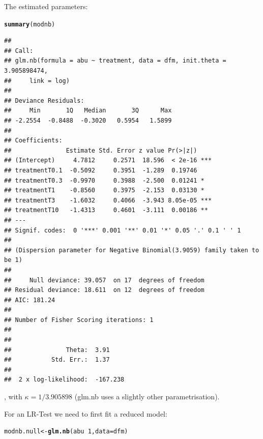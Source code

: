 \documentclass{scrartcl}\usepackage[]{graphicx}\usepackage[]{color}
\makeatletter
\newcommand{\hlnum}[1]{\textcolor[rgb]{0.686,0.059,0.569}{#1}}%
\newcommand{\hlopt}[1]{\textcolor[rgb]{0,0,0}{#1}}%
\newcommand{\hlstd}[1]{\textcolor[rgb]{0.345,0.345,0.345}{#1}}%
\newcommand{\hlkwb}[1]{\textcolor[rgb]{0.69,0.353,0.396}{#1}}%
\newcommand{\hlkwc}[1]{\textcolor[rgb]{0.333,0.667,0.333}{#1}}%
\newcommand{\hlkwd}[1]{\textcolor[rgb]{0.737,0.353,0.396}{\textbf{#1}}}%
\newenvironment{kframe}{%
 \def\at@end@of@kframe{}%
 \ifinner\ifhmode%
  \def\at@end@of@kframe{\end{minipage}}%
  \begin{minipage}{\columnwidth}%
 \fi\fi%
 \def\FrameCommand##1{\hskip\@totalleftmargin \hskip-\fboxsep
 \colorbox{shadecolor}{##1}\hskip-\fboxsep
     \hskip-\linewidth \hskip-\@totalleftmargin \hskip\columnwidth}%
 \MakeFramed {\advance\hsize-\width
   \@totalleftmargin\z@ \linewidth\hsize
   \@setminipage}}%
 {\par\unskip\endMakeFramed%
 \at@end@of@kframe}
\newenvironment{knitrout}{}{} %
\makeatother
\begin{document}
The estimated parameters:
\begin{knitrout}
\color{fgcolor}\begin{kframe}
\begin{alltt}
\hlkwd{summary}\hlstd{(modnb)}
\end{alltt}
\begin{verbatim}
## 
## Call:
## glm.nb(formula = abu ~ treatment, data = dfm, init.theta = 3.905898474, 
##     link = log)
## 
## Deviance Residuals: 
##     Min       1Q   Median       3Q      Max  
## -2.2554  -0.8488  -0.3020   0.5954   1.5899  
## 
## Coefficients:
##               Estimate Std. Error z value Pr(>|z|)    
## (Intercept)     4.7812     0.2571  18.596  < 2e-16 ***
## treatmentT0.1  -0.5092     0.3951  -1.289  0.19746    
## treatmentT0.3  -0.9970     0.3988  -2.500  0.01241 *  
## treatmentT1    -0.8560     0.3975  -2.153  0.03130 *  
## treatmentT3    -1.6032     0.4066  -3.943 8.05e-05 ***
## treatmentT10   -1.4313     0.4601  -3.111  0.00186 ** 
## ---
## Signif. codes:  0 '***' 0.001 '**' 0.01 '*' 0.05 '.' 0.1 ' ' 1
## 
## (Dispersion parameter for Negative Binomial(3.9059) family taken to be 1)
## 
##     Null deviance: 39.057  on 17  degrees of freedom
## Residual deviance: 18.611  on 12  degrees of freedom
## AIC: 181.24
## 
## Number of Fisher Scoring iterations: 1
## 
## 
##               Theta:  3.91 
##           Std. Err.:  1.37 
## 
##  2 x log-likelihood:  -167.238
\end{verbatim}
\end{kframe}
\end{knitrout}
, with $\kappa = 1 / 3.905898$ (glm.nb uses a slightly other parametrisation).

For an LR-Test we need to first fit a reduced model:
\begin{knitrout}
\color{fgcolor}\begin{kframe}
\begin{alltt}
\hlstd{modnb.null} \hlkwb{<-} \hlkwd{glm.nb}\hlstd{(abu} \hlopt{~} \hlnum{1}\hlstd{,} \hlkwc{data} \hlstd{= dfm)}
\end{alltt}
\end{kframe}
\end{knitrout}
\end{document}
